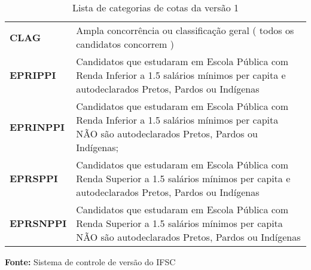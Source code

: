 \begin{table}
\caption{Lista de categorias de cotas da versão 1}
\label{tabela_categoriasv1}
\centering
\begin{tabular}{ l l }
   \cline{1-1}\cline{2-2}  
    \multicolumn{1}{|p{5.850cm}|}{\textbf{CLAG}} &
    \multicolumn{1}{p{8.217cm}|}{Ampla concorrência ou classificação geral 
( todos os candidatos concorrem )}
  \\ 
   \cline{1-1}\cline{2-2}  
    \multicolumn{1}{|p{5.850cm}|}{\textbf{EPRIPPI}} &
    \multicolumn{1}{p{8.217cm}|}{Candidatos que estudaram em Escola Pública com Renda Inferior a 1.5 salários mínimos per capita e autodeclarados Pretos, Pardos ou Indígenas}
  \\    
   \cline{1-1}\cline{2-2}  
    \multicolumn{1}{|p{5.850cm}|}{\textbf{EPRINPPI}} &
    \multicolumn{1}{p{8.217cm}|}{Candidatos que estudaram em Escola Pública com Renda Inferior a 1.5 salários mínimos per capita NÃO são autodeclarados Pretos, Pardos ou Indígenas; }
  \\    
   \cline{1-1}\cline{2-2}  
    \multicolumn{1}{|p{5.850cm}|}{\textbf{EPRSPPI}} &
    \multicolumn{1}{p{8.217cm}|}{Candidatos que estudaram em Escola Pública com Renda Superior a 1.5 salários mínimos per capita e autodeclarados Pretos, Pardos ou Indígenas}
  \\     
   \cline{1-1}\cline{2-2}  
    \multicolumn{1}{|p{5.850cm}|}{\textbf{EPRSNPPI}} &
    \multicolumn{1}{p{8.217cm}|}{Candidatos que estudaram em Escola Pública com Renda Superior a 1.5 salários mínimos per capita NÃO são autodeclarados Pretos, Pardos ou Indígenas}
  \\       
  \hline

 \end{tabular} 
  \par\medskip\textbf{Fonte:} Sistema de controle de versão do IFSC \par\medskip
\end{table}
